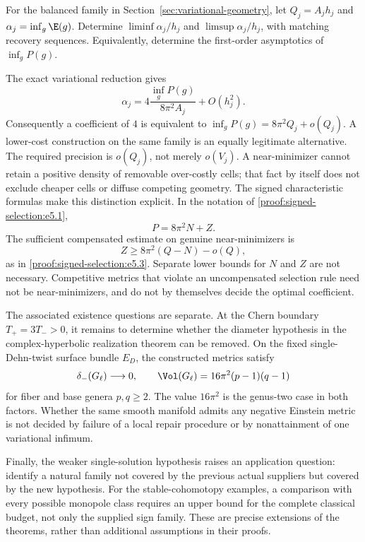 \begin{problem}
For the balanced family in Section~\ref{sec:variational-geometry}, let
$Q_j=A_jh_j$ and $\alpha_j=\inf_g\E(g)$. Determine
$\liminf\alpha_j/h_j$ and $\limsup\alpha_j/h_j$, with matching recovery
sequences. Equivalently, determine the first-order asymptotics of
$\inf_gP(g)$.
\end{problem}
The exact variational reduction gives
\[
 \alpha_j=4\frac{\inf_gP(g)}{8\pi^2A_j}+O(h_j^2).
\]
Consequently a coefficient of $4$ is equivalent to
$\inf_gP(g)=8\pi^2Q_j+o(Q_j)$. A lower-cost construction on the same
family is an equally legitimate alternative. The required precision is
$o(Q_j)$, not merely $o(V_j)$. A near-minimizer cannot retain a positive
density of removable over-costly cells; that fact by itself does not
exclude cheaper cells or diffuse competing geometry. The signed
characteristic formulas make this distinction explicit. In the notation
of \eqref{proof:signed-selection:e5.1},
\[
 P=8\pi^2N+Z.
\]
The sufficient compensated estimate on genuine near-minimizers is
\begin{equation}\label{eq:open-compensated}
 Z\ge8\pi^2(Q-N)-o(Q),
\end{equation}
as in \eqref{proof:signed-selection:e5.3}. Separate lower bounds for
$N$ and $Z$ are not necessary. Competitive metrics that violate an
uncompensated selection rule need not be near-minimizers, and do not by
themselves decide the optimal coefficient.

The associated existence questions are separate. At the Chern boundary
$T_+=3T_->0$, it remains to determine whether the diameter hypothesis in
the complex-hyperbolic realization theorem can be removed. On the fixed
single-Dehn-twist surface bundle $E_D$, the constructed metrics satisfy
\[
 \delta_-(G_\ell)\longrightarrow0,\qquad
 \Vol(G_\ell)=16\pi^2(p-1)(q-1)
\]
for fiber and base genera $p,q\ge2$. The value $16\pi^2$ is the
genus-two case in both factors. Whether the same smooth manifold admits
any negative Einstein metric is not decided by failure of a local repair
procedure or by nonattainment of one variational infimum.

Finally, the weaker single-solution hypothesis raises an application
question: identify a natural family not covered by the previous actual
suppliers but covered by the new hypothesis. For the stable-cohomotopy
examples, a comparison with every possible monopole class requires an
upper bound for the complete classical budget, not only the supplied
sign family. These are precise extensions of the theorems, rather than
additional assumptions in their proofs.
